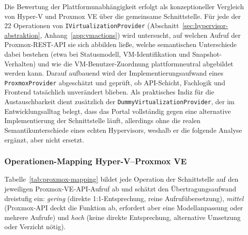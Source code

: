 \documentclass[12pt,a4paper]{article}
\begin{document}
Die Bewertung der Plattformunabhängigkeit erfolgt als konzeptioneller Vergleich von Hyper-V und Proxmox VE über die gemeinsame Schnittstelle. Für jede der 22 Operationen von \texttt{IVirtualizationProvider} (Abschnitt~\ref{sec:hypervisor-abstraktion}, Anhang~\ref{app:vmactions}) wird untersucht, auf welchen Aufruf der Proxmox-REST-API \parencite{proxmox-ve-api} sie sich abbilden ließe, welche semantischen Unterschiede dabei bestehen (etwa bei Statusmodell, VM-Identifikation und Snapshot-Verhalten) und wie die VM-Benutzer-Zuordnung plattformneutral abgebildet werden kann. Darauf aufbauend wird der Implementierungsaufwand eines \texttt{ProxmoxProvider} abgeschätzt und geprüft, ob API-Schicht, Fachlogik und Frontend tatsächlich unverändert blieben. Als praktisches Indiz für die Austauschbarkeit dient zusätzlich der \texttt{DummyVirtualizationProvider}, der im Entwicklungsalltag belegt, dass das Portal vollständig gegen eine alternative Implementierung der Schnittstelle läuft, allerdings ohne die realen Semantikunterschiede eines echten Hypervisors, weshalb er die folgende Analyse ergänzt, aber nicht ersetzt.

\subsubsection{Operationen-Mapping Hyper-V–Proxmox VE}

Tabelle~\ref{tab:proxmox-mapping} bildet jede Operation der Schnittstelle auf den jeweiligen Proxmox-VE-API-Aufruf ab und schätzt den Übertragungsaufwand dreistufig ein: \emph{gering} (direkte 1:1-Entsprechung, reine Aufrufübersetzung), \emph{mittel} (Proxmox-API deckt die Funktion ab, erfordert aber eine Modellanpassung oder mehrere Aufrufe) und \emph{hoch} (keine direkte Entsprechung, alternative Umsetzung oder Verzicht nötig).
\end{document}
